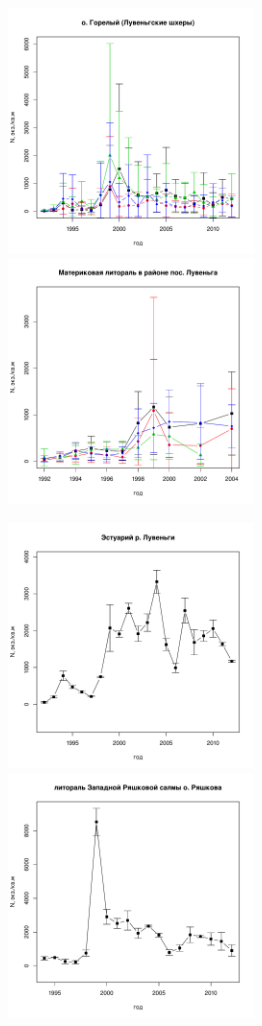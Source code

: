 \documentclass[12pt, a4paper]{article}
\begin{document}
\begin{figure}[h]

\begin{multicols}{2}
\hfill
\includegraphics[width=65mm]{../White_Sea/Luvenga_Goreliy/N2_dynamic.pdf}
\hfill
\includegraphics[width=65mm]{../White_Sea//Luvenga_II_razrez/N2_dynamic.pdf}
\end{multicols}



\begin{multicols}{2}
\hfill
\includegraphics[width=65mm]{../White_Sea/Estuatiy_Luvenga/N2_dynamic.pdf}
\hfill
\includegraphics[width=65mm]{../White_Sea/Ryashkov_ZRS/N2_dynamic.pdf}
\end{multicols}


\end{figure}
\end{document}
